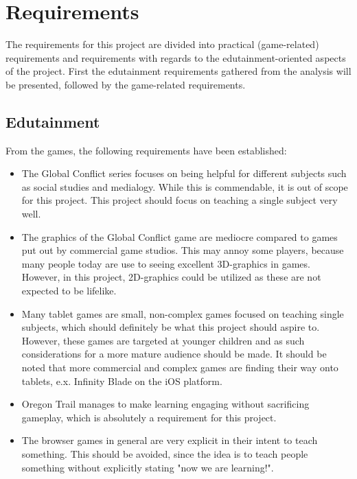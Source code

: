 \section{Requirements}
\label{sec:requirements}

The requirements for this project are divided into practical (game-related) requirements and requirements with regards to the edutainment-oriented aspects of the project. First the edutainment requirements gathered from the analysis will be presented, followed by the game-related requirements.

\subsection{Edutainment}

From the games, the following requirements have been established: 

\begin{itemize}
	\item The Global Conflict series focuses on being helpful for different subjects such as social studies and medialogy. While this is commendable, it is out of scope for this project. This project should focus on teaching a single subject very well.

	\item The graphics of the Global Conflict game are mediocre compared to games put out by commercial game studios. This may annoy some players, because many people today are use to seeing excellent 3D-graphics in games. However, in this project, 2D-graphics could be utilized as these are not expected to be lifelike.

	\item Many tablet games are small, non-complex games focused on teaching single subjects, which should definitely be what this project should aspire to. However, these games are targeted at younger children and as such considerations for a more mature audience should be made. It should be noted that more commercial and complex games are finding their way onto tablets, e.x. Infinity Blade on the iOS platform.

	\item Oregon Trail manages to make learning engaging without sacrificing gameplay, which is absolutely a requirement for this project.

	\item The browser games in general are very explicit in their intent to teach something. This should be avoided, since the idea is to teach people something without explicitly stating "now we are learning!". 
\end{itemize}

